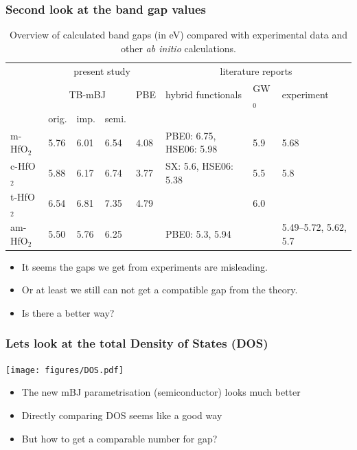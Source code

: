 \documentclass{beamer}
\begin{document}
\begin{frame}
    \frametitle{Second look at the band gap values}

\begin{table}
\scriptsize \caption{\label{gaps}Overview of calculated band gaps (in eV) compared with experimental data and other \textit{ab initio} calculations.}
\setlength{\tabcolsep}{0.5em}
\tiny
\begin{tabular}{l|llll|lll}
 & \multicolumn{4}{c|}{present study} & \multicolumn{3}{c}{literature reports}\\
 & \multicolumn{3}{c|}{TB-mBJ} & PBE & hybrid functionals & GW$_0$ & experiment\\
 & orig. & imp. & semi. & & & & \\
\hline
m-HfO$_2$ &     5.76 & 6.01 & 6.54 & 4.08 & PBE0: 6.75, HSE06: 5.98 & 5.9 & 5.68 \\
c-HfO$_2$ &     5.88 & 6.17 & 6.74 & 3.77 & SX: 5.6, HSE06: 5.38 & 5.5 & 5.8\\
t-HfO$_2$ &     6.54 & 6.81 & 7.35 & 4.79 & & 6.0 & \\
am-HfO$_2$ & 5.50 & 5.76 & 6.25 & & PBE0: 5.3, 5.94 &  & 5.49--5.72, 5.62, 5.7\\

\end{tabular}
\end{table}

\begin{itemize}
\item It seems the gaps we get from experiments are misleading.
\item Or at least we still can not get a compatible gap from the theory.
\item Is there a better way?
\end{itemize}

\end{frame}

\begin{frame}
\frametitle{Lets look at the total Density of States (DOS)}

\begin{center}
	\texttt{[image: figures/DOS.pdf]}
\end{center}

\begin{itemize}
\item The new mBJ parametrisation (semiconductor) looks much better
\item Directly comparing DOS seems like a good way  
\item But how to get a comparable number for gap?
\end{itemize}

\end{frame}
\end{document}
